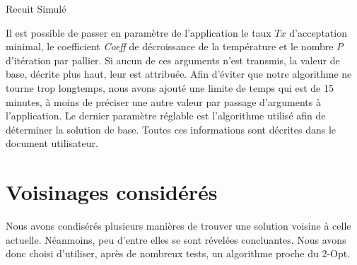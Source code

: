 \documentclass{article}
\begin{document}
\begin{algorithm}[H]
	\SetAlgoLined
	\caption{Recuit Simulé}
\end{algorithm}

Il est possible de passer en paramètre de l'application le taux \emph{$Tx$} d'acceptation minimal,
le coefficient \emph{Coeff} de décroissance de la température et le nombre \emph{P} d'itération par pallier.
Si aucun de ces arguments n'est transmis, la valeur de base, décrite plus haut, leur est attribuée.
Afin d'éviter que notre algorithme ne tourne trop longtemps, nous avons ajouté une limite de temps qui est de 15 minutes, à moins de préciser une autre valeur par passage d'arguments à l'application.
Le dernier paramètre réglable est l'algorithme utilisé afin de déterminer la solution de base.
Toutes ces informations sont décrites dans le document utilisateur.

\section{Voisinages considérés}

Nous avons condisérés plusieurs manières de trouver une solution voisine à celle actuelle. Néanmoins, peu d'entre elles se sont révelées concluantes. Nous avons donc choisi d'utiliser, après de nombreux tests, un algorithme proche du 2-Opt.
\end{document}
